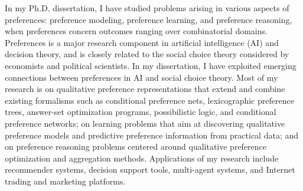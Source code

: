 In my Ph.D. dissertation, I have studied problems arising in various aspects of preferences:
preference modeling, preference learning, and preference reasoning, 
when preferences concern outcomes ranging over combinatorial domains.
Preferences is a major research component
in artificial intelligence (AI) and decision theory, and is closely related to the 
social choice theory considered by economists and political scientists. 
In my dissertation, I have exploited emerging connections between 
preferences in AI and social choice theory. 
Most of my research is on qualitative preference representations that extend and combine
existing formalisms such as conditional preference nets, 
lexicographic preference trees, answer-set optimization programs,
possibilistic logic, and conditional preference networks; on 
learning problems that aim at discovering qualitative preference models and 
predictive preference information from practical data; and on
preference reasoning problems centered around qualitative preference optimization 
and aggregation methods.
Applications of my
research include recommender systems, decision support tools, multi-agent systems,
and Internet trading and marketing platforms.
